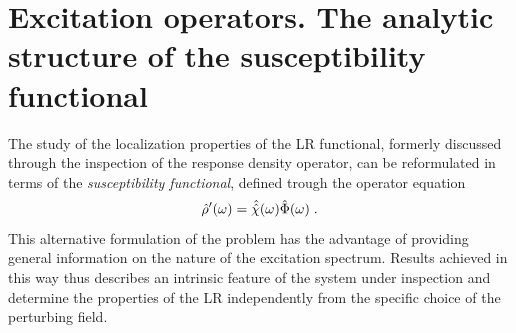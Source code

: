 \documentclass[reprint,aps,prb]{revtex4-1}
\newcommand{\be}{\begin{equation}}
\newcommand{\ee}{\end{equation}}
\newcommand{\lb}{\label}
\newcommand{\op}[1]{\hat {#1}}
\newcommand{\sop}[1]{\op{\op {#1}}}
\newcommand{\dm}{\op{\rho}}
\begin{document}
\section{Excitation operators. The analytic structure of the susceptibility functional}

The study of the localization properties of the LR functional, formerly discussed through the inspection of the response density operator, can be reformulated in terms of the 
\emph{susceptibility functional}, defined trough the operator equation  
\be\lb{SusceptibilityDef1}
\dm'(\omega) = \sop{{\cal \chi}}(\omega) \op\Phi(\omega) \;. 
\ee
This alternative formulation of the problem has the advantage of providing general information on the nature of the excitation spectrum. Results achieved in this way thus describes an intrinsic 
feature of the system under inspection and determine the properties of the LR independently from the specific choice of the perturbing field. 
\end{document}
